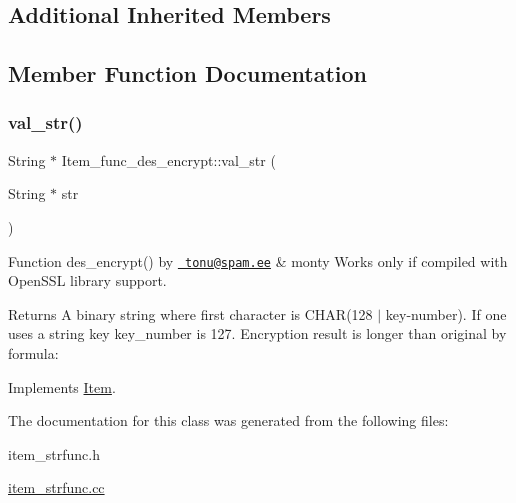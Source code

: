 \subsection*{Additional Inherited Members}


\subsection{Member Function Documentation}
\mbox{\label{classItem__func__des__encrypt_a6f5d91012ab3f03cfc2265ba28c4e5f1}} 
\subsubsection{\texorpdfstring{val\+\_\+str()}{val\_str()}}
{\footnotesize\ttfamily String $\ast$ Item\+\_\+func\+\_\+des\+\_\+encrypt\+::val\+\_\+str (\begin{DoxyParamCaption}\item[{String $\ast$}]{str }\end{DoxyParamCaption})\hspace{0.3cm}{\ttfamily [virtual]}}

Function des\+\_\+encrypt() by \href{mailto:tonu@spam.ee}\texttt{ tonu@spam.\+ee} \& monty Works only if compiled with Open\+S\+SL library support. \begin{DoxyReturn}{Returns}
A binary string where first character is C\+H\+AR(128 $\vert$ key-\/number). If one uses a string key key\+\_\+number is 127. Encryption result is longer than original by formula\+: 
\begin{DoxyCode}{0}
\end{DoxyCode}
 
\end{DoxyReturn}


Implements \mbox{\hyperlink{classItem}{Item}}.



The documentation for this class was generated from the following files\+:\begin{DoxyCompactItemize}
\item 
item\+\_\+strfunc.\+h\item 
\mbox{\hyperlink{item__strfunc_8cc}{item\+\_\+strfunc.\+cc}}\end{DoxyCompactItemize}

